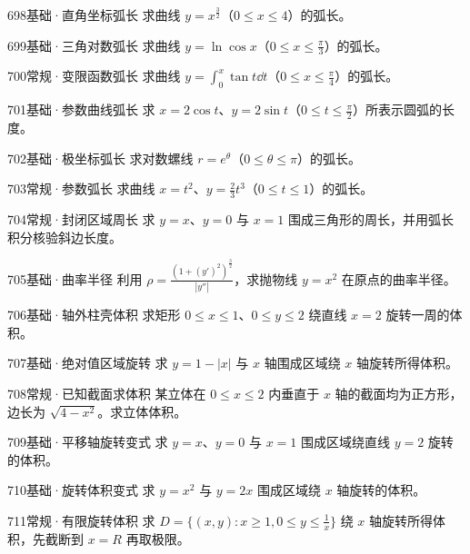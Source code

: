 \begin{exercise}{698}{基础·直角坐标弧长}
求曲线 $y=x^{\frac{3}{2}}$（$0\le x\le4$）的弧长。
\end{exercise}
\begin{exercise}{699}{基础·三角对数弧长}
求曲线 $y=\ln\cos x$（$0\le x\le\frac{\pi}{3}$）的弧长。
\end{exercise}
\begin{exercise}{700}{常规·变限函数弧长}
求曲线 $y=\int_0^x\tan t\dd t$（$0\le x\le\frac{\pi}{4}$）的弧长。
\end{exercise}
\begin{exercise}{701}{基础·参数曲线弧长}
求 $x=2\cos t$、$y=2\sin t$（$0\le t\le\frac{\pi}{2}$）所表示圆弧的长度。
\end{exercise}
\begin{exercise}{702}{基础·极坐标弧长}
求对数螺线 $r=e^\theta$（$0\le\theta\le\pi$）的弧长。
\end{exercise}
\begin{exercise}{703}{常规·参数弧长}
求曲线 $x=t^2$、$y=\frac23t^3$（$0\le t\le1$）的弧长。
\end{exercise}
\begin{exercise}{704}{常规·封闭区域周长}
求 $y=x$、$y=0$ 与 $x=1$ 围成三角形的周长，并用弧长积分核验斜边长度。
\end{exercise}
\begin{exercise}{705}{基础·曲率半径}
利用 $\rho=\frac{(1+(y')^2)^{\frac{3}{2}}}{|y''|}$，求抛物线 $y=x^2$ 在原点的曲率半径。
\end{exercise}
\begin{exercise}{706}{基础·轴外柱壳体积}
求矩形 $0\le x\le1$、$0\le y\le2$ 绕直线 $x=2$ 旋转一周的体积。
\end{exercise}
\begin{exercise}{707}{基础·绝对值区域旋转}
求 $y=1-|x|$ 与 $x$ 轴围成区域绕 $x$ 轴旋转所得体积。
\end{exercise}
\begin{exercise}{708}{常规·已知截面求体积}
某立体在 $0\le x\le2$ 内垂直于 $x$ 轴的截面均为正方形，边长为 $\sqrt{4-x^2}$。求立体体积。
\end{exercise}
\begin{exercise}{709}{基础·平移轴旋转变式}
求 $y=x$、$y=0$ 与 $x=1$ 围成区域绕直线 $y=2$ 旋转的体积。
\end{exercise}
\begin{exercise}{710}{基础·旋转体积变式}
求 $y=x^2$ 与 $y=2x$ 围成区域绕 $x$ 轴旋转的体积。
\end{exercise}
\begin{exercise}{711}{常规·有限旋转体积}
求 $D=\{(x,y):x\ge1,0\le y\le\frac{1}{x}\}$ 绕 $x$ 轴旋转所得体积，先截断到 $x=R$ 再取极限。
\end{exercise}
